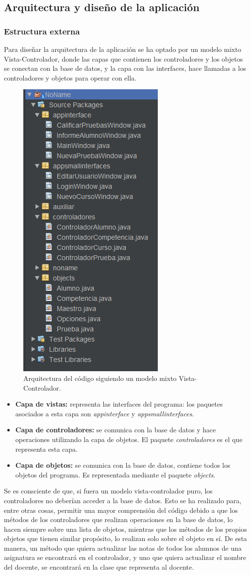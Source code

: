 \subsection{Arquitectura y diseño de la aplicación}

\subsubsection{Estructura externa}
Para diseñar la arquitectura de la aplicación se ha optado por un modelo mixto Vista-Controlador, donde las capas que contienen los controladores y los objetos se conectan con la base de datos, y la capa con las interfaces, hace llamadas a los controladores y objetos para operar con ella.

\begin{figure}[H]
\centering\includegraphics[width=0.25\linewidth]{figs/arquitectura.png}
\caption{Arquitectura del código siguiendo un modelo mixto Vista-Controlador.}
\label{Fig:arquitectura}
\end{figure}

\begin{itemize}
	\item \textbf{Capa de vistas:} representa las interfaces del programa: los paquetes asociados a esta capa son \textit{appinterface} y \textit{appsmallinterfaces}.
	\item \textbf{Capa de controladores:} se comunica con la base de datos y hace operaciones utilizando la capa de objetos. El paquete \textit{controladores} es el que representa esta capa.
	\item \textbf{Capa de objetos:} se comunica con la base de datos, contiene todos los objetos del programa. Es representada mediante el paquete \textit{objects}.
\end{itemize}

Se es consciente de que, si fuera un modelo vista-controlador puro, los controladores no deberían acceder a la base de datos. Esto se ha realizado para, entre otras cosas, permitir una mayor comprensión del código debido a que los métodos de los controladores que realizan operaciones en la base de datos, lo hacen siempre sobre una lista de objetos, mientras que los métodos de los propios objetos que tienen similar propósito, lo realizan solo sobre el objeto en sí. De esta manera, un método que quiera actualizar las notas de todos los alumnos de una asignatura se encontrará en el controlador, y uno que quiera actualizar el nombre del docente, se encontrará en la clase que representa al docente.

